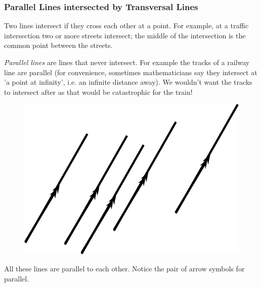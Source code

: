             \subsubsection{ Parallel Lines intersected by Transversal Lines}
            \nopagebreak
            \label{m39370*id316211}Two lines intersect if they cross each other at a point. For example, at a traffic intersection two or more streets intersect; the middle of the intersection is the common point between the streets.\par 
        \label{m39370*id316216}\textsl{Parallel lines} are lines that never intersect. For example the tracks of a railway line are parallel (for convenience, sometimes mathematicians say they intersect at 'a point at infinity', i.e. an infinite distance away). We wouldn't want the tracks to intersect after as that would be catastrophic for the train!\par 
        \label{m39370*id316225}
    \setcounter{subfigure}{0}
	\begin{figure}[H] %
    \begin{center}
    \label{m39370*id316228!!!underscore!!!media}\label{m39370*id316228!!!underscore!!!printimage}\includegraphics{col11306.imgs/m39370_MG10C13_010.png} %
      \vspace{2pt}
    \vspace{.1in}
    \end{center}
 \end{figure}       
        \par 
        \label{m39370*id316235}All these lines are parallel to each other. Notice the pair of arrow symbols for parallel.\par 

